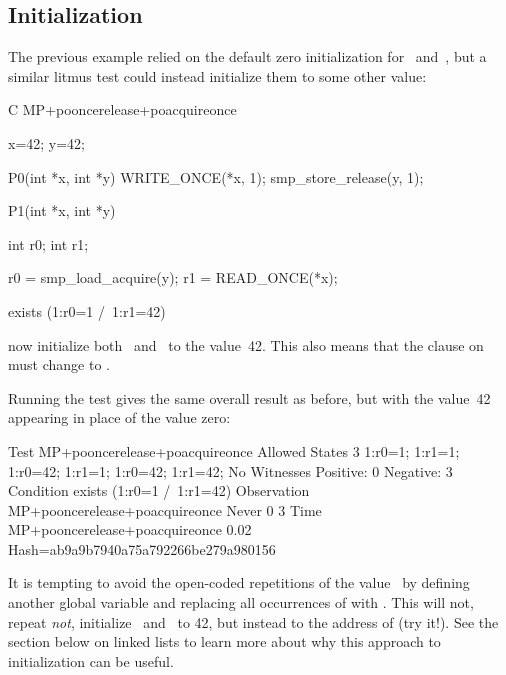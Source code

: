\subsection{Initialization}

The previous example relied on the default zero initialization for~
and~, but a similar litmus test could instead initialize them
to some other value:

\begin{fcvlabel}
\begin{VerbatimN}[commandchars=\%\@\$]
	C MP+pooncerelease+poacquireonce

	{               %
		x=42;
		y=42;
	}               %

	P0(int *x, int *y)
	{
		WRITE_ONCE(*x, 1);
		smp_store_release(y, 1);
	}

	P1(int *x, int *y)
	{
		int r0;
		int r1;

		r0 = smp_load_acquire(y);
		r1 = READ_ONCE(*x);
	}

	exists (1:r0=1 /\ 1:r1=42)   %
\end{VerbatimN}
\end{fcvlabel}

\begin{fcvref}
 now initialize both~ and~ to
the value~42.
This also means that the  clause on  must change
 to .
\end{fcvref}

Running the test gives the same overall result as before, but with the
value~42 appearing in place of the value zero:

\begin{VerbatimN}
	Test MP+pooncerelease+poacquireonce Allowed
	States 3
	1:r0=1; 1:r1=1;
	1:r0=42; 1:r1=1;
	1:r0=42; 1:r1=42;
	No
	Witnesses
	Positive: 0 Negative: 3
	Condition exists (1:r0=1 /\ 1:r1=42)
	Observation MP+pooncerelease+poacquireonce Never 0 3
	Time MP+pooncerelease+poacquireonce 0.02
	Hash=ab9a9b7940a75a792266be279a980156
\end{VerbatimN}

It is tempting to avoid the open-coded repetitions of the value~
by defining another global variable  and replacing all
occurrences of  with .
This will not, repeat \emph{not}, initialize~ and~ to 42,
but instead to the address of  (try it!).
See the section below on linked lists to learn more about why this approach
to initialization can be useful.


